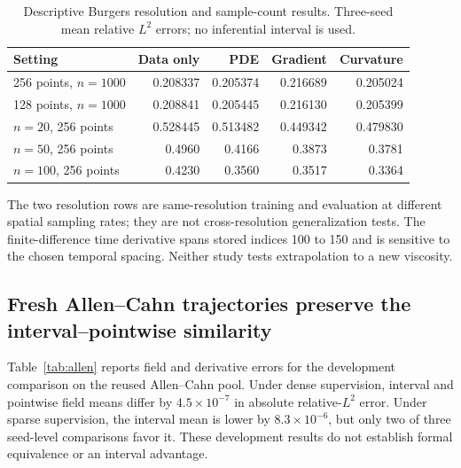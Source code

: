 \documentclass[a4paper,fleqn]{cas-sc}
\begin{document}
\begin{table}
\centering\small
\caption{Descriptive Burgers resolution and sample-count results. Three-seed mean relative $L^2$ errors; no inferential interval is used.}
\label{tab:sample-resolution}
\begin{tabular}{lrrrr}
\toprule
Setting & Data only & PDE & Gradient & Curvature \\
\midrule
256 points, $n=1000$ & 0.208337 & 0.205374 & 0.216689 & 0.205024 \\
128 points, $n=1000$ & 0.208841 & 0.205445 & 0.216130 & 0.205399 \\
$n=20$, 256 points & 0.528445 & 0.513482 & 0.449342 & 0.479830 \\
$n=50$, 256 points & 0.4960 & 0.4166 & 0.3873 & 0.3781 \\
$n=100$, 256 points & 0.4230 & 0.3560 & 0.3517 & 0.3364 \\
\bottomrule
\end{tabular}
\end{table}

The two resolution rows are same-resolution training and evaluation at different spatial sampling rates; they are not cross-resolution generalization tests. The finite-difference time derivative spans stored indices 100 to 150 and is sensitive to the chosen temporal spacing. Neither study tests extrapolation to a new viscosity.

\subsection{Fresh Allen--Cahn trajectories preserve the interval--pointwise similarity}
Table~\ref{tab:allen} reports field and derivative errors for the development comparison on the reused Allen--Cahn pool. Under dense supervision, interval and pointwise field means differ by $4.5\times10^{-7}$ in absolute relative-$L^2$ error. Under sparse supervision, the interval mean is lower by $8.3\times10^{-6}$, but only two of three seed-level comparisons favor it. These development results do not establish formal equivalence or an interval advantage.
\end{document}
